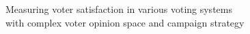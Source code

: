 Measuring voter satisfaction in various voting systems
\\
with complex voter opinion space and campaign strategy
